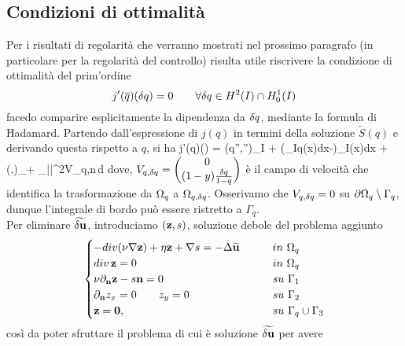 \subsection{Condizioni di ottimalità}

Per i risultati di regolarità che verranno mostrati nel prossimo paragrafo (in particolare per la regolarità del controllo) risulta utile riscrivere la condizione di ottimalità del prim'ordine
\begin{equation}
	j'(\overline{q})({\delta q})=0\qquad\forall{\delta q}\in H^2(I)\cap H^1_0(I)
\label{eq:ottimalita}
\end{equation}
facedo comparire esplicitamente la dipendenza da ${\delta q}$, mediante la formula di Hadamard. Partendo dall'espressione di $j(q)$ in termini della soluzione $\widetilde{S}(q)$ e derivando questa rispetto a $q$, si ha
\beq
	j'(q)(\dq) = \alpha(q'',\dq'')_I + \beta\left(\int_I{q(x)dx}-\right)\int_I{\dq(x)dx} + (\nabla\widetilde{\u},\nabla\widetilde{\du})_\Oq + \int_{\partial\Oq}{|\nabla\widetilde{\u}|^2V_{q,\dq}\cdot\mathbf n\,d\Gamma}
\label{eq:preHad}
\eeq
dove, $V_{q,{\delta q}}=\begin{pmatrix}0\\(1-y)\frac{{\delta q}}{1-q}\end{pmatrix}$ è il campo di velocità che identifica la trasformazione da ${\Omega_q}$ a $\Omega_{q,{\delta q}}$. Osserivamo che $V_{q,{\delta q}}=0$ su $\partial{\Omega_q}\setminus\Gamma_q$, dunque l'integrale di bordo può essere ristretto a $\Gamma_q$.\\
Per eliminare $\widetilde{\mathbf{\delta u}}$, introduciamo $(\mathbf{z},s)$, soluzione debole del problema aggiunto
\begin{equation}
	\begin{cases}
		-div(\nu\nabla\mathbf z) +\eta\z+\nabla s= -\Delta\widetilde\u\qquad &in\ \Oq\\
		div\,\mathbf z = 0\qquad &in\ \Oq\\
		\nu\partial_{\mathbf n}\z -s\mathbf n= 0\qquad &su\ \Gamma_1\\
		\partial_{\mathbf n}z_x = 0\qquad z_y=0 &su\ \Gamma_2\\
		\mathbf z = \mathbf 0,\quad &su\ \Gamma_q\cup\Gamma_3
	\end{cases}
\label{eq:PAHad}
\end{equation}
così da poter sfruttare il problema di cui è soluzione $\widetilde{\mathbf{\delta u}}$ per avere
\beq
